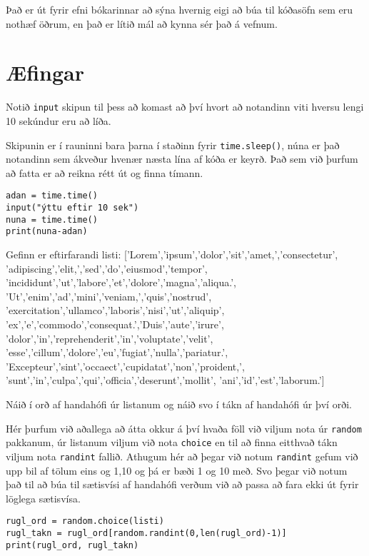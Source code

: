Það er út fyrir efni bókarinnar að sýna hvernig eigi að búa til kóðasöfn sem eru nothæf öðrum, en það er lítið mál að kynna sér það á vefnum.

\newpage
\section{Æfingar}

\begin{exercise}\label{imp1}
Notið \texttt{input} skipun til þess að komast að því hvort að notandinn viti hversu lengi 10 sekúndur eru að líða. 
\end{exercise}
\begin{Answer}[ref={imp1}]
Skipunin er í rauninni bara þarna í staðinn fyrir \texttt{time.sleep()}, núna er það notandinn sem ákveður hvenær næsta lína af kóða er keyrð.
Það sem við þurfum að fatta er að reikna rétt út og finna tímann.
	\begin{lstlisting}
adan = time.time()
input("ýttu eftir 10 sek")
nuna = time.time()
print(nuna-adan)\end{lstlisting}
\end{Answer}


\begin{exercise}\label{imp2}
Gefinn er eftirfarandi listi: 
['Lorem','ipsum','dolor','sit','amet,','consectetur',
'adipiscing','elit,','sed','do','eiusmod','tempor',
'incididunt','ut','labore','et','dolore','magna','aliqua.',
'Ut','enim','ad','mini','veniam,','quis','nostrud',
'exercitation','ullamco','laboris','nisi','ut','aliquip',
'ex','e','commodo','consequat.','Duis','aute','irure',
'dolor','in','reprehenderit','in','voluptate','velit',
'esse','cillum','dolore','eu','fugiat','nulla','pariatur.',
'Excepteur','sint','occaect','cupidatat','non','proident,',
'sunt','in','culpa','qui','officia','deserunt','mollit',
'ani','id','est','laborum.']

Náið í orð af handahófi úr listanum og náið svo í tákn af handahófi úr því orði.
\end{exercise}
\begin{Answer}[ref={imp2}]
Hér þurfum við aðallega að átta okkur á því hvaða föll við viljum nota úr \texttt{random} pakkanum, úr listanum viljum við nota \texttt{choice} en til að finna eitthvað tákn viljum nota \texttt{randint} fallið.
Athugum hér að þegar við notum \texttt{randint} gefum við upp bil af tölum eins og 1,10 og þá er bæði 1 og 10 með.
Svo þegar við notum það til að búa til sætisvísi af handahófi verðum við að passa að fara ekki út fyrir löglega sætisvísa.
	\begin{lstlisting}
rugl_ord = random.choice(listi)
rugl_takn = rugl_ord[random.randint(0,len(rugl_ord)-1)]
print(rugl_ord, rugl_takn)\end{lstlisting}
\end{Answer}